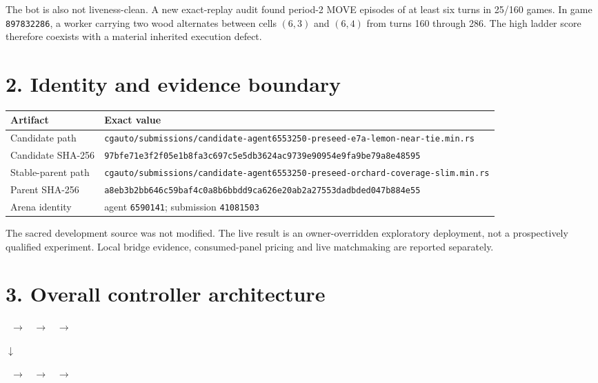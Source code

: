 \documentclass[10pt,a4paper]{article}
\begin{document}
The bot is also not liveness-clean. A new exact-replay audit found period-2 MOVE episodes of
at least six turns in 25/160 games. In game \texttt{897832286}, a worker carrying two wood
alternates between cells $(6,3)$ and $(6,4)$ from turns 160 through 286. The high ladder
score therefore coexists with a material inherited execution defect.

\section*{2. Identity and evidence boundary}

\begin{tabularx}{\textwidth}{@{}p{31mm}Y@{}}
\toprule
\textbf{Artifact} & \textbf{Exact value} \\
\midrule
Candidate path & \nolinkurl{cgauto/submissions/candidate-agent6553250-preseed-e7a-lemon-near-tie.min.rs} \\
Candidate SHA-256 & \scriptsize\texttt{97bfe71e3f2f05e1b8fa3c697c5e5db3624ac9739e90954e9fa9be79a8e48595} \\
Stable-parent path & \nolinkurl{cgauto/submissions/candidate-agent6553250-preseed-orchard-coverage-slim.min.rs} \\
Parent SHA-256 & \scriptsize\texttt{a8eb3b2bb646c59baf4c0a8b6bbdd9ca626e20ab2a27553dadbded047b884e55} \\
Arena identity & agent \texttt{6590141}; submission \texttt{41081503} \\
\bottomrule
\end{tabularx}

The sacred development source was not modified. The live result is an owner-overridden
exploratory deployment, not a prospectively qualified experiment. Local bridge evidence,
consumed-panel pricing and live matchmaking are reported separately.

\section*{3. Overall controller architecture}

\begin{center}
\ $\rightarrow$ \ $\rightarrow$
\ $\rightarrow$ 

$\downarrow$

\ $\rightarrow$ \ $\rightarrow$
\ $\rightarrow$ 
\end{center}
\end{document}

